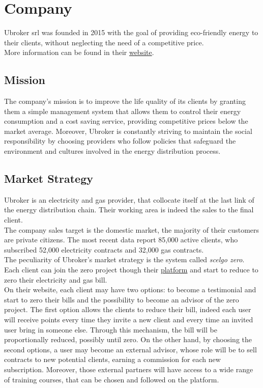 \documentclass[12pt, a4paper, oneside]{article}
\begin{document}
\newpage
\section{Company}
Ubroker srl was founded in 2015 with the goal of providing eco-friendly energy to their clients, without neglecting the need of a competitive price.\\
More information can be found in their \href{https://ubroker.it/}{website}.
\subsection{Mission}
The company's mission is to improve the life quality of its clients by granting them a simple management system that allows them to control their energy consumption and a cost saving service, providing 
competitive prices below the market average. Moreover, Ubroker is constantly striving to maintain the social responsibility by choosing providers who follow policies that safeguard the environment and cultures
involved in the energy distribution process.

\subsection{Market Strategy}
Ubroker is an electricity and gas provider, that collocate itself at the last link of the energy distribution chain. Their working area is indeed the sales to the final client.\\
The company sales target is the domestic market, the majority of their customers are private citizens. The most recent data report 85,000 active clients, who subscribed 52,000 electricity contracts
and 32,000 gas contracts.\\
The peculiarity of Ubroker's market strategy is the system called \emph{scelgo zero}. Each client can join the zero project though their \href{https://scelgozero.it/}{platform} and start to reduce to zero their
electricity and gas bill.\\
On their website, each client may have two options: to become a testimonial and start to zero their bills and the possibility to become an advisor of the zero project. The first option allows the clients to reduce their bill, indeed each user will receive points
every time they invite a new client and every time an invited user bring in someone else. Through this mechanism, the bill will be proportionally reduced, possibly until zero.
On the other hand, by choosing the second options, a user may become an external advisor, whose role will be to sell contracts to new potential clients, earning a commission for each new subscription. 
Moreover, those external partners will have access to a wide range of training courses, that can be chosen and followed on the platform.
\end{document}

